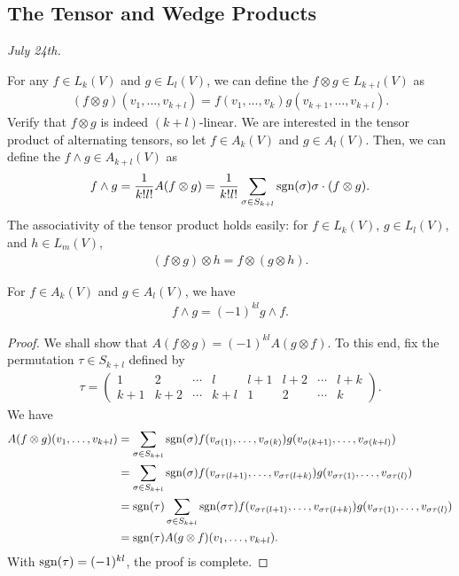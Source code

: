 \subsection{The Tensor and Wedge Products}

\noindent \textit{July 24th.}

For any $f \in L_{k}(V)$ and $g \in L_{l}(V)$, we can define the  $f \otimes g \in L_{k+l}(V)$ as
\begin{align}
    (f \otimes g)(v_{1},\ldots,v_{k+l}) = f(v_{1},\ldots,v_{k})g(v_{k+1},\ldots,v_{k+l}).
\end{align}
Verify that $f \otimes g$ is indeed $(k+l)$-linear. We are interested in the tensor product of alternating tensors, so let $f \in A_{k}(V)$ and $g \in A_{l}(V)$. Then, we can define the  $f \wedge g \in A_{k+l}(V)$ as
\begin{align}
    f \wedge g = \frac{1}{k!l!} A(f \otimes g) = \frac{1}{k!l!} \sum_{\sigma \in S_{k+l}} \operatorname{sgn}(\sigma) \sigma \cdot (f \otimes g).
\end{align}
The associativity of the tensor product holds easily: for $f \in L_{k}(V)$, $g \in L_{l}(V)$, and $h \in L_{m}(V)$,
\begin{align}
    (f \otimes g) \otimes h = f \otimes (g \otimes h).
\end{align}

\begin{proposition}
    For $f \in A_{k}(V)$ and $g \in A_{l}(V)$, we have
    \begin{align}
        f \wedge g = (-1)^{kl} g \wedge f.
    \end{align}
\end{proposition}
\begin{proof}
    We shall show that $A(f \otimes g) = (-1)^{kl} A(g \otimes f)$. To this end, fix the permutation $\tau \in S_{k+l}$ defined by
    \begin{align}
        \tau = \begin{pmatrix}
            1 & 2 & \cdots & l & l+1 & l+2 & \cdots & l+k \\
            k+1 & k+2 & \cdots & k+l & 1 & 2 & \cdots & k
        \end{pmatrix}.
    \end{align}
    We have
    \begin{align}
        A(f \otimes g)(v_{1},\ldots,v_{k+l}) &= \sum_{\sigma \in S_{k+l}} \operatorname{sgn}(\sigma) f(v_{\sigma(1)},\ldots,v_{\sigma(k)}) g(v_{\sigma(k+1)},\ldots,v_{\sigma(k+l)}) \notag \\
        &= \sum_{\sigma \in S_{k+l}} \operatorname{sgn}(\sigma) f(v_{\sigma\tau(l+1)},\ldots,v_{\sigma\tau(l+k)}) g(v_{\sigma\tau(1)},\ldots,v_{\sigma\tau(l)}) \notag \\
        &= \operatorname{sgn}(\tau) \sum_{\sigma \in S_{k+l}} \operatorname{sgn}(\sigma\tau) f(v_{\sigma\tau(l+1)},\ldots,v_{\sigma\tau(l+k)}) g(v_{\sigma\tau(1)},\ldots,v_{\sigma\tau(l)}) \notag \\
        &= \operatorname{sgn}(\tau)A(g \otimes f)(v_{1},\ldots,v_{k+l}).
    \end{align}
    With $\operatorname{sgn}(\tau) = (-1)^{kl}$, the proof is complete.
\end{proof}


